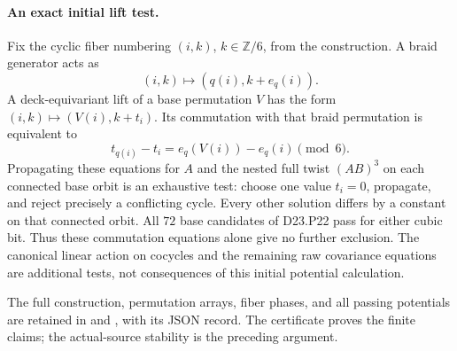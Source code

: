 \paragraph{An exact initial lift test.}
Fix the cyclic fiber numbering $(i,k)$, $k\in\mathbb Z/6$,
from the construction. A braid generator acts as
\[
              (i,k)\longmapsto(q(i),k+e_q(i)).
\]
A deck-equivariant lift of a base permutation $V$ has
the form $(i,k)\mapsto(V(i),k+t_i)$. Its commutation
with that braid permutation is equivalent to
\[
             t_{q(i)}-t_i=e_q(V(i))-e_q(i)\pmod6.
\]
Propagating these equations for $A$ and the nested full
twist $(AB)^3$ on each connected base orbit is an
exhaustive test: choose one value $t_i=0$, propagate,
and reject precisely a conflicting cycle. Every other
solution differs by a constant on that connected orbit.
All $72$ base candidates of D23.P22 pass for either
cubic bit. Thus these commutation equations alone
give no further exclusion. The canonical linear action
on cocycles and the remaining raw covariance equations
are additional tests, not consequences of this initial
potential calculation.

The full construction, permutation arrays, fiber phases,
and all passing potentials are retained in
 and
, with its
JSON record. The certificate proves the finite claims;
the actual-source stability is the preceding argument.

